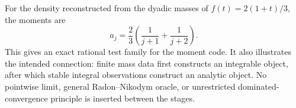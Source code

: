 For the density reconstructed from the dyadic masses of
\(f(t)=2(1+t)/3\), the moments are
\[
 a_j=\frac23\left(\frac1{j+1}+\frac1{j+2}\right).
\]
This gives an exact rational test family for the moment code. It also
illustrates the intended connection: finite mass data first constructs
an integrable object, after which stable integral observations construct
an analytic object. No pointwise limit, general Radon--Nikodym oracle,
or unrestricted dominated-convergence principle is inserted between
the stages.
